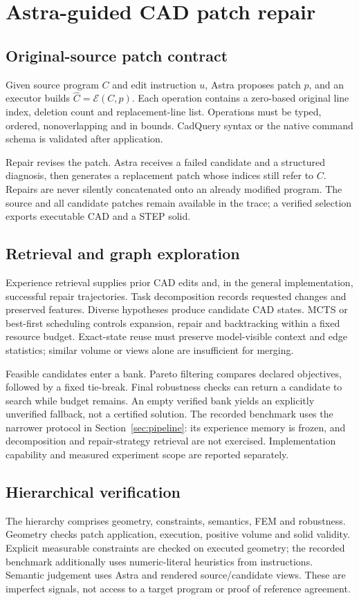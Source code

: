 \section{Astra-guided CAD patch repair}
\label{sec:method}
\subsection{Original-source patch contract}
Given source program $C$ and edit instruction $u$, Astra proposes patch $p$, and an executor builds $\hat C=\mathcal E(C,p)$. Each operation contains a zero-based original line index, deletion count and replacement-line list. Operations must be typed, ordered, nonoverlapping and in bounds. CadQuery syntax or the native command schema is validated after application.

Repair revises the patch. Astra receives a failed candidate and a structured diagnosis, then generates a replacement patch whose indices still refer to $C$. Repairs are never silently concatenated onto an already modified program. The source and all candidate patches remain available in the trace; a verified selection exports executable CAD and a STEP solid.

\subsection{Retrieval and graph exploration}
Experience retrieval supplies prior CAD edits and, in the general implementation, successful repair trajectories. Task decomposition records requested changes and preserved features. Diverse hypotheses produce candidate CAD states. MCTS or best-first scheduling controls expansion, repair and backtracking within a fixed resource budget. Exact-state reuse must preserve model-visible context and edge statistics; similar volume or views alone are insufficient for merging.

Feasible candidates enter a bank. Pareto filtering compares declared objectives, followed by a fixed tie-break. Final robustness checks can return a candidate to search while budget remains. An empty verified bank yields an explicitly unverified fallback, not a certified solution. The recorded benchmark uses the narrower protocol in Section~\ref{sec:pipeline}: its experience memory is frozen, and decomposition and repair-strategy retrieval are not exercised. Implementation capability and measured experiment scope are reported separately.

\subsection{Hierarchical verification}
The hierarchy comprises geometry, constraints, semantics, FEM and robustness. Geometry checks patch application, execution, positive volume and solid validity. Explicit measurable constraints are checked on executed geometry; the recorded benchmark additionally uses numeric-literal heuristics from instructions. Semantic judgement uses Astra and rendered source/candidate views. These are imperfect signals, not access to a target program or proof of reference agreement.

